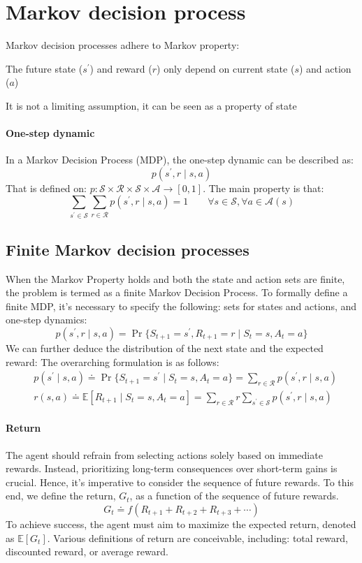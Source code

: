 \section{Markov decision process}

Markov decision processes adhere to Markov property: 
\begin{property}
    The future state ($s^\prime$) and reward ($r$) only depend on current state ($s$) and action ($a$)
\end{property}
It is not a limiting assumption, it can be seen as a
property of state 

\paragraph*{One-step dynamic}
In a Markov Decision Process (MDP), the one-step dynamic can be described as:
\[p(s^\prime,r\mid s,a)\]
That is defined on: $p:\mathcal{S}\times\mathcal{R}\times\mathcal{S}\times\mathcal{A}\rightarrow\left[0,1\right]$. 
The main property is that: 
\[\sum_{s^\prime\in\mathcal{S}}\sum_{r\in\mathcal{R}}p(s^\prime,r\mid s,a)=1\qquad \forall s \in \mathcal{S},\forall a\in\mathcal{A}(s)\]

\subsection{Finite Markov decision processes}
When the Markov Property holds and both the state and action sets are finite, the problem is termed as a finite Markov Decision Process. 
To formally define a finite MDP, it's necessary to specify the following: sets for states and actions, and one-step dynamics:
\[p(s^\prime, r \mid s, a) = \Pr\{S_{t+1}=s^\prime, R_{t+1}=r \mid S_t=s, A_t=a\}\]
We can further deduce the distribution of the next state and the expected reward: 
The overarching formulation is as follows:
\begin{align*}
    &p(s^\prime \mid s, a) \doteq \Pr\{S_{t+1} = s^\prime \mid S_t = s, A_t = a\} = \sum_{r \in \mathcal{R}} p(s^\prime, r \mid s, a) \\
    &r(s, a) \doteq \mathbb{E}\left[R_{t+1} \mid S_t = s, A_t = a\right] = \sum_{r \in \mathcal{R}} r \sum_{s^\prime \in \mathcal{S}} p(s^\prime, r \mid s, a) 
\end{align*}

\paragraph*{Return}
The agent should refrain from selecting actions solely based on immediate rewards. 
Instead, prioritizing long-term consequences over short-term gains is crucial. 
Hence, it's imperative to consider the sequence of future rewards. 
To this end, we define the return, $G_t$, as a function of the sequence of future rewards.
\[G_t \doteq f\left(R_{t+1}+R_{t+2}+R_{t+3}+\cdots\right)\]
To achieve success, the agent must aim to maximize the expected return, denoted as $\mathbb{E}\left[G_t\right]$. 
Various definitions of return are conceivable, including: total reward, discounted reward, or average reward. 

